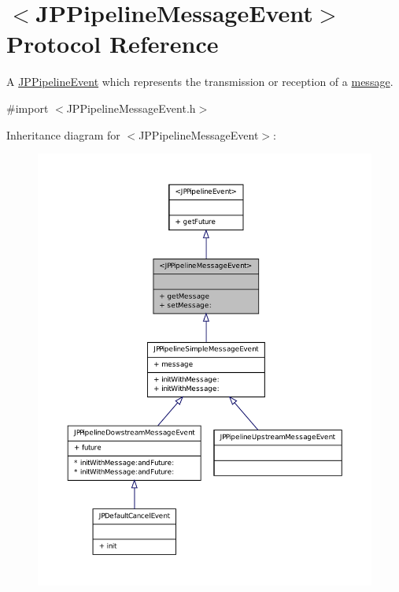 \hypertarget{a00031}{
\section{$<$JPPipelineMessageEvent$>$ Protocol Reference}
\label{a00031}
}


A \hyperlink{a00023}{JPPipelineEvent} which represents the transmission or reception of a \hyperlink{a00006}{message}.  




{\ttfamily \#import $<$JPPipelineMessageEvent.h$>$}



Inheritance diagram for $<$JPPipelineMessageEvent$>$:\nopagebreak
\begin{figure}[H]
\begin{center}
\leavevmode
\includegraphics[width=400pt]{a00143}
\end{center}
\end{figure}


